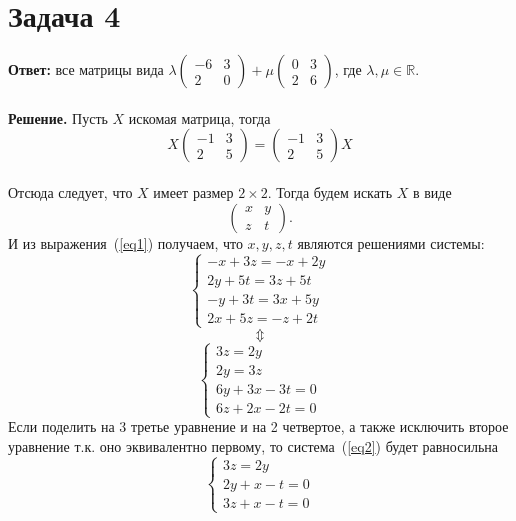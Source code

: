 \documentclass{article}
\begin{document}
\section*{Задача 4}
{\bf Ответ:} все матрицы вида $\lambda\left(\begin{array}{rr}-6 & 3\\2 & 0\end{array}\right)+\mu\left(\begin{array}{rr}0 & 3\\2 & 6\end{array}\right)$, где $\lambda,\mu\in\mathbb{R}$.
\\
\\
{\bf Решение.} Пусть $X$ искомая матрица, тогда
\begin{equation}
\label{eq1}
    X\left(\begin{array}{rr}-1 & 3\\2 & 5\end{array}\right)=\left(\begin{array}{rr}-1 & 3\\2 & 5\end{array}\right)X
\end{equation}
\\
Отсюда следует, что $X$ имеет размер $2\times 2$. Тогда будем искать $X$ в виде 
$$\left(\begin{array}{rr}x & y\\z & t\end{array}\right).$$
И из выражения~(\ref{eq1}) получаем, что $x,y,z,t$ являются решениями системы:
$$\begin{cases}-x+3z=-x+2y\\2y+5t=3z+5t\\-y+3t=3x+5y\\2x+5z=-z+2t\end{cases}$$
$$\Updownarrow$$
\begin{equation}
\label{eq2}
    \begin{cases}3z=2y\\2y=3z\\6y+3x-3t=0\\6z+2x-2t=0\end{cases}
\end{equation}
Если поделить на 3 третье уравнение и на 2 четвертое, а также исключить второе уравнение т.к. оно эквивалентно первому, то система~(\ref{eq2}) будет равносильна
\begin{equation}
\label{eq3}
    \begin{cases}3z=2y\\2y+x-t=0\\3z+x-t=0\end{cases}
\end{equation}
\end{document}
